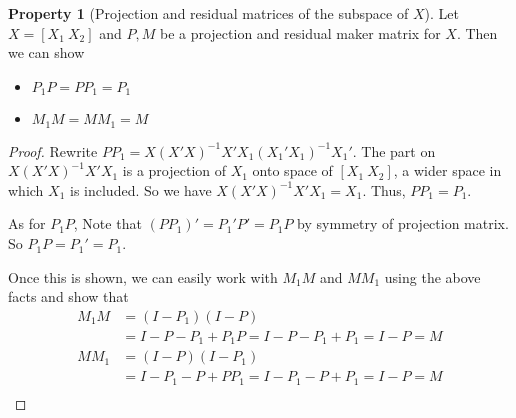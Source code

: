 \documentclass[12pt]{article}
\theoremstyle{definition}
\theoremstyle{property}
\newtheorem{property}{Property}[section]
\theoremstyle{assumption}
\theoremstyle{example}
\theoremstyle{comment}
\begin{document}
\begin{mdframed}[backgroundcolor=green!5] 
\begin{property}[Projection and residual matrices of the subspace of $X$] 
Let $X=[X_1 \ X_2]$ and $P,M$ be a projection and residual maker matrix for $X$. Then we can show
\begin{itemize} 
\item $P_1P=PP_1=P_1$
\item $M_1M=MM_1=M$
\end{itemize}
\begin{proof}
Rewrite  $PP_1=X(X'X)^{-1}X'X_1(X_1'X_1)^{-1}X_1'$. The part on $X(X'X)^{-1}X'X_1$ is a projection of $X_1$ onto space of $[X_1 \ X_2]$, a wider space in which $X_1$ is included. So we have $X(X'X)^{-1}X'X_1=X_1$. Thus, $PP_1=P_1$. \par
As for $P_1P$, Note that $(PP_1)'=P_1'P'=P_1P$ by symmetry of projection matrix. So $P_1P=P_1'=P_1$.\par
Once this is shown, we can easily work with $M_1M$ and $MM_1$ using the above facts and show that
\[
\begin{aligned}
M_1M&=(I-P_1)(I-P)\\
&=I-P-P_1+P_1P = I-P-P_1+P_1 = I-P=M\\
MM_1&=(I-P)(I-P_1)\\
&=I-P_1-P+PP_1 = I-P_1-P+P_1 = I-P=M\\
\end{aligned}
\]
\end{proof}
\end{property}
\end{mdframed}
\end{document}
